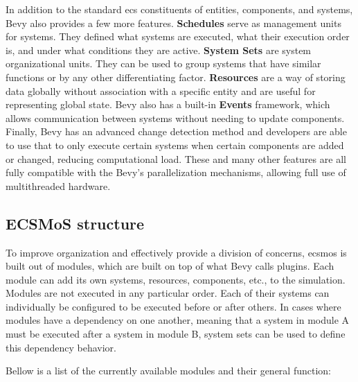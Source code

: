 \documentclass[twoside, 11pt]{article}
\begin{document}
In addition to the standard \gls{ecs} constituents of entities, components, and systems, Bevy also provides a few more features. \textbf{Schedules} serve as management units for systems. They defined what systems are executed, what their execution order is, and under what conditions they are active. \textbf{System Sets} are system organizational units. They can be used to group systems that have similar functions or by any other differentiating factor. \textbf{Resources} are a way of storing data globally without association with a specific entity and are useful for representing global state. Bevy also has a built-in \textbf{Events} framework, which allows communication between systems without needing to update components. Finally, Bevy has an advanced change detection method and developers are able to use that to only execute certain systems when certain components are added or changed, reducing computational load. These and many other features are all fully compatible with the Bevy's parallelization mechanisms, allowing full use of multithreaded hardware.

\subsection{ECSMoS structure}

To improve organization and effectively provide a division of concerns, \gls{ecsmos} is built out of modules, which are built on top of what Bevy calls plugins. Each module can add its own systems, resources, components, etc., to the simulation. Modules are not executed in any particular order. Each of their systems can individually be configured to be executed before or after others. In cases where modules have a dependency on one another, meaning that a system in module A must be executed after a system in module B, system sets can be used to define this dependency behavior.

Bellow is a list of the currently available modules and their general function:
\end{document}
